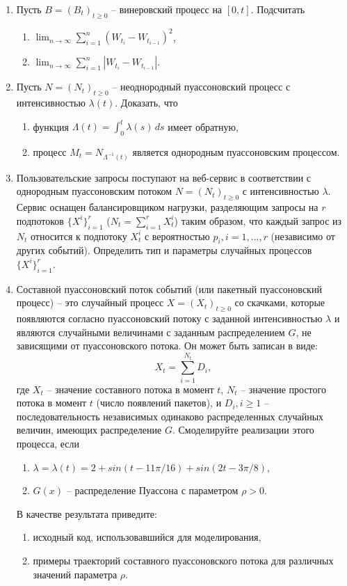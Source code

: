 \documentclass[a4paper,14pt]{extreport}
\renewcommand{\=}[1]{\stackrel{#1}{=}} %
\newcommand{\generaltime}{t \geqslant 0}
\newcommand{\newprocess}[1]{
	\ensuremath{
		#1 = \left(#1 _t\right)_{\generaltime}
	}
}
\begin{document}
\begin{enumerate}
\item Пусть $\newprocess{B}$ -- винеровский процесс на $[0, t]$. Подсчитать 
	\begin{enumerate}
	    \item $\lim_{n \to \infty} \sum_{i=1}^n \left(W_{t_i} - W_{t_{i-1}}\right)^2$,
	    \item $\lim_{n \to \infty} \sum_{i=1}^n \left|W_{t_i} - W_{t_{i-1}}\right|$.
	\end{enumerate}

\item Пусть $\newprocess{N}$ -- неоднородный пуассоновский
процесс с интенсивностью $\lambda(t)$. Доказать, что 
	\begin{enumerate}
	    \item функция $\Lambda(t) = \int_{0}^t \lambda(s) \, ds$ имеет обратную,
	    \item процесс $M_t = N_{\Lambda^{-1}(t)}$ является однородным пуассоновским процессом. 
	\end{enumerate}

\item Пользовательские запросы поступают на веб-сервис
в соответствии с однородным пуассоновским потоком $\newprocess{N}$
с интенсивностью $\lambda$. Сервис оснащен балансировщиком
нагрузки, разделяющим запросы на $r$ подпотоков
$\{X^i\}_{i = 1}^r$ ($N_t = \sum_{i=1}^r X^i_t$)
таким образом, что каждый запрос из $N_t$ 
относится к подпотоку $X^i_t$ с вероятностью
$p_i, i=1, \ldots, r$ (независимо от других событий).
Определить тип и параметры случайных процессов
$\{X^i\}_{i = 1}^r$.

\item Составной пуассоновский поток событий (или пакетный пуассоновский процесс)
-- это случайный процесс $\newprocess{X}$ со скачками, которые появляются
согласно пуассоновский потоку с заданной интенсивностью $\lambda$
и являются случайными величинами с заданным распределением $G$,
не зависящими от пуассоновского потока. Он может быть записан в виде:
\[
X_t = \sum\limits_{i = 1}^{N_t} D_i,
\]
где $X_t$ -- значение составного потока в момент $t$, $N_t$ -- 
значение простого потока в момент $t$ (число появлений пакетов),
и $D_i, i \geqslant 1$ -- последовательность независимых
одинаково распределенных случайных величин, имеющих распределение $G$.
Смоделируйте реализации этого процесса, если
	\begin{enumerate}
		\item $\lambda = \lambda(t) = 
		2 + sin (t - 11\pi/16) + sin (2t - 3\pi/8)$,
		\item $G(x)$ -- распределение Пуассона с параметром $\rho > 0$.
	\end{enumerate}
В качестве результата приведите:
\begin{enumerate}
	\item исходный код, использовавшийся для моделирования,
	\item примеры траекторий составного пуассоновского потока
	для различных значений параметра $\rho$.
\end{enumerate}


\end{enumerate}
\end{document}
